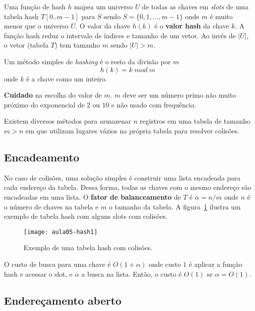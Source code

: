 Uma função de hash $h$ mapea um universo $U$  de todas as chaves em 
\emph{slots} de uma tabela hash $T[0..m-1]$ para $S$ sendo
$S = \{0, 1, ..., m-1\}$ onde $m$ é muito menor que o universo $U$.
O valor da chave $h(k)$ é o {\bf valor hash} da chave $k$.
A função hash reduz o intervalo de índices e tamanho de um vetor.
Ao invés de $|U|$, o vetor (tabela $T$) tem tamanho $m$ sendo $|U| > m$.

Um método simples de \emph{hashing} é o resto da divisão por $m$
\begin{equation*}
h(k) = k\; mod\; m
\end{equation*}
onde $k$ é a chave como um inteiro.

{\bf Cuidado} na escolha do valor de $m$. $m$ deve ser um número primo não muito
próximo do exponencial de $2$ ou $10$ e não usado com frequência.

Existem diversos métodos para armazenar $n$ registros em uma tabela de tamanho
$m > n$ em que utilizam lugares vázios na própria tabela para resolver
colisões.

\subsection{Encadeamento}

No caso de colisões, uma solução simples é construir uma lista 
encadeada para cada endereço da tabela.
Dessa forma, todas as chaves com o mesmo endereço são encadeadas em uma lista.
O {\bf fator de balanceamento} de $T$ é $\alpha = n/m$ onde $n$ é o número
de chaves na tabela e $m$ o tamanho da tabela.
A figura~\ref{aula05:fig:hash} ilustra um exemplo de tabela hash com alguns
slots com colisões.
%
\begin{figure}[ht]
\centering
\texttt{[image: aula05-hash1]}
\caption{Exemplo de uma tabela hash com colisões.}
\label{aula05:fig:hash}
\end{figure}

O custo de busca para uma chave é $O(1 + \alpha)$ onde custo $1$ é aplicar
a função hash e acessar o slot, e $\alpha$ a busca na lista.
Então, o custo é $O(1)$ se $\alpha = O(1)$.

\subsection{Endereçamento aberto}

